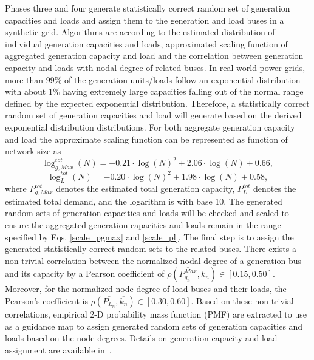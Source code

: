 \documentclass[12pt]{article}
\numberwithin{equation}{section}
\numberwithin{table}{section}
\numberwithin{figure}{section}
\begin{document}
Phases three and four generate statistically correct random set of generation capacities and loads and assign them to the generation and load buses in a synthetic grid. Algorithms are according to the estimated distribution of individual generation capacities and loads, approximated scaling function of aggregated generation capacity and load and the correlation between generation capacity and loads with nodal degree of related buses. In real-world power grids, more than $99\%$ of the generation units/loads follow an exponential distribution with about $1\%$ having extremely large capacities falling out of the normal range defined by the expected exponential distribution. Therefore, a statistically correct random set of generation capacities and load will generate based on the derived exponential distribution distributions. For both aggregate generation capacity and load the approximate scaling function can be represented as function of network size as
\begin{equation} \label{scale_pgmax}
	\log^{tot}_{g,Max}(N) = -0.21 \cdot \log(N)^2 + 2.06 \cdot \log(N) + 0.66,
\end{equation}
\begin{equation} \label{scale_pl}
	\log^{tot}_{L}(N) = -0.20 \cdot \log(N)^2 + 1.98 \cdot \log(N) + 0.58,
\end{equation}
where $P^{tot}_{g,Max}$ denotes the estimated total generation capacity, $P_L^{tot}$ denotes the estimated total demand, and the logarithm is with base 10. The generated random sets of generation capacities and loads will be checked and scaled to ensure the aggregated generation capacities and loads remain in the range specified by Eqs. \ref {scale_pgmax} and \ref{scale_pl}. The final step is to assign the generated statistically correct random sets to the related buses. There exists a non-trivial correlation between the normalized nodal degree of a generation bus and its capacity by a Pearson coefficient of $\rho(\overline{P^{Max}_{g_n}} , \overline{k_n}) \in [0.15, 0.50]$. Moreover, for the normalized node degree of load buses and their loads, the  Pearson's coefficient is $\rho (\overline {P_{L_n}} , \overline{k_n}) \in [0.30, 0.60]$. Based on these non-trivial correlations, empirical 2-D probability mass function (PMF) are extracted to use as a guidance map to assign generated random sets of generation capacities and loads based on the node degrees. Details on generation capacity and load assignment are available in~\cite{syngrid_gen_load}.
\end{document}
